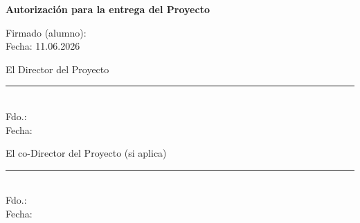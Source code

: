 \vspace{0.5em}

\noindent{}

\vspace{1.6em}

\noindent\textbf{Autorización para la entrega del Proyecto}

\vspace{2.2em}

\noindent Firmado (alumno): \autorTFM\\[0.4em]
\noindent Fecha: 11.06.2026

\vspace{2.4em}

\noindent
\begin{minipage}[t]{0.48\linewidth}
  \centering
  El Director del Proyecto\\[2.6em]
  \rule{0.85\linewidth}{0.4pt}\\[0.3em]
  Fdo.: \tutorTFM\\[0.3em]
  Fecha:
\end{minipage}\hfill
\begin{minipage}[t]{0.48\linewidth}
  \centering
  El co-Director del Proyecto (si aplica)\\[2.6em]
  \rule{0.85\linewidth}{0.4pt}\\[0.3em]
  Fdo.:\\[0.3em]
  Fecha:
\end{minipage}

\cleardoublepage

